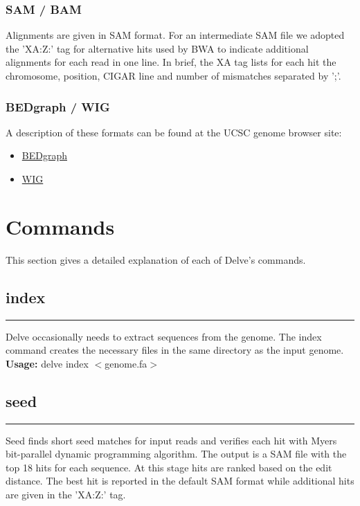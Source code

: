 \documentclass[11pt,a4paper,oneside]{book}
\begin{document}
\subsection{SAM / BAM}
Alignments are given in SAM\cite{Li:2009p24} format. For an intermediate SAM file we adopted the 'XA:Z:' tag for alternative hits used by BWA\cite{Li:2009p3} to indicate additional alignments for each read in one line. In brief, the XA tag lists for each hit the chromosome, position, CIGAR line and number of mismatches separated by ';'. \\
\subsection{BEDgraph / WIG}

A description of these formats can be found at the UCSC genome browser site: 
\begin{itemize} 
\item \href{http://genome.ucsc.edu/goldenPath/help/bedgraph.html}{BEDgraph}
\item \href{http://genome.ucsc.edu/goldenPath/help/wiggle.html}{WIG}
\end{itemize}


\chapter*{ {\color{blue} Commands}}
\setcounter{chapter}{3}
\setcounter{section}{0}
  
This section gives a detailed explanation of each of Delve's commands. 
  
\section{index}
\rule[1cm]{\textwidth}{1pt}

Delve occasionally needs to extract sequences from the genome. The index command creates the necessary files in the same directory as the input genome.\\

{\bf Usage:} delve index $<$genome.fa$>$


\section{seed}
\rule[1cm]{\textwidth}{1pt}
Seed finds short seed matches for input reads and verifies each hit with Myers bit-parallel dynamic programming algorithm\cite{Myers:1998p28}. The output is a SAM file with the top 18 hits for each sequence. At this stage hits are ranked based on the edit distance. The best hit is reported in the default SAM format while additional hits are given in the 'XA:Z:' tag.\\ 
\end{document}

